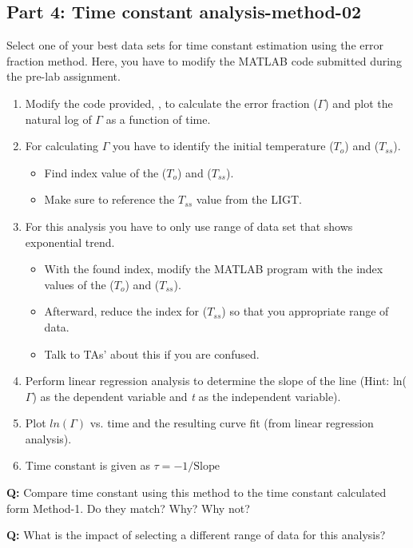 \documentclass{article} %
\begin{document}
\subsection{Part 4: Time constant analysis-method-02}
Select one of your best data sets for time constant estimation using the error fraction method. Here, you have to modify the MATLAB code submitted during the pre-lab assignment.
\begin{enumerate}
    \item Modify the code provided, , to calculate the error fraction ($\Gamma$) and plot the natural log of $\Gamma$ as a function of time.
    \item For calculating $\Gamma$ you have to identify the initial temperature ($T_{o}$) and ($T_{ss}$). 
    \begin{itemize}
        \item Find index value of the ($T_{o}$) and ($T_{ss}$).
        \item Make sure to reference the $T_{ss}$ value from the LIGT.
    \end{itemize}
    \item For this analysis you have to only use range of data set that shows exponential trend. 
    \begin{itemize}
        \item With the found index, modify the MATLAB program with the index values of the ($T_{o}$) and ($T_{ss}$).
        \item Afterward, reduce the index for ($T_{ss}$) so that you appropriate range of data.
        \item Talk to TAs' about this if you are confused.
    \end{itemize}
    \item Perform linear regression analysis to determine the slope of the line (Hint: ln($\Gamma$) as the dependent variable and \textit{t} as the independent variable).
    \item Plot $ln(\Gamma)$ vs. time and the resulting curve fit (from linear regression analysis).
    \item Time constant is given as $\tau = -1/\textrm{Slope}$
\end{enumerate}

\textbf{Q:}  Compare time constant using this method to the time constant calculated form Method-1. Do they match? Why? Why not?

\textbf{Q:}  What is the impact of selecting a different range of data for this analysis? %
\end{document}
